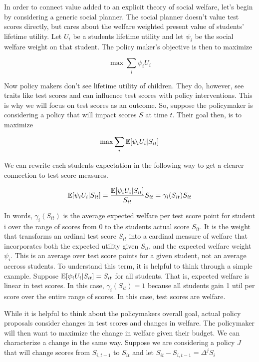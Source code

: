 \documentclass[12pt]{article}
\theoremstyle{definition}
\theoremstyle{definition}
\theoremstyle{definition}
\theoremstyle{definition}
\begin{document}
    In order to connect value added to an explicit theory of social welfare, let's begin by considering a generic social planner. The social planner doesn't value test scores directly, but cares about the welfare weighted present value of students' lifetime utility. Let $U_i$ be a students lifetime utility and let $\psi_i$ be the social welfare weight on that student. The policy maker's objective is then to maximize
    
    \begin{equation}
     \max \sum_i \psi_i U_{i}
    \end{equation}
    
  Now policy makers don't see lifetime utility of children. They do, however, see traits like test scores and can influence test scores with policy interventions. This is why we will focus on test scores as an outcome. So, suppose the policymaker is considering a policy that will impact scores $S$ at time $t$. Their goal then, is to maximize 
 
     \begin{equation}
     \max \sum_i \mathbb{E}[ \psi_i U_{i} |S_{it}]
    \end{equation}
    
    We can rewrite each students expectation in the following way to get a clearer connection to test score measures. 
    
    \begin{equation}
         \mathbb{E}[ \psi_i U_{i} |S_{it}] = \frac{\mathbb{E}[ \psi_i U_{i} |S_{it}]}{S_{it}} S_{it} = \gamma_i(S_{it}) S_{it}
    \end{equation}

    
    In words, $\gamma_i(S_{it})$  is the average expected welfare per test score point for student i over the range of scores from 0 to the students actual score $S_{it}$. It is the weight that transforms an ordinal test score $S_{it}$ into a cardinal measure of welfare that incorporates both the expected utility given $S_{it}$, and the expected welfare weight $\psi_i$. This is an average over test score points for a given student, not an average accross students. To understand this term, it is helpful to think through a simple example. Suppose  $ \mathbb{E}[ \psi_i U_{i} |S_{it}]= S_{it}$ for all students. That is, expected welfare is linear in test scores. In this case,  $\gamma_i(S_{it}) = 1$ because all students gain 1 util per score over the entire range of scores. In this case, test scores are welfare. 
  
    While it is helpful to think about the policymakers overall goal, actual policy proposals consider changes in test scores and changes in welfare. The policymaker will then want to maximize the change in welfare given their budget. We can characterize a change in the same way. Suppose we are considering a policy $J$ that will change scores from $S_{i,t-1}$ to $S_{it}$ and let $S_{it} - S_{i,t-1} = \Delta^jS_i$
    
\end{document}

